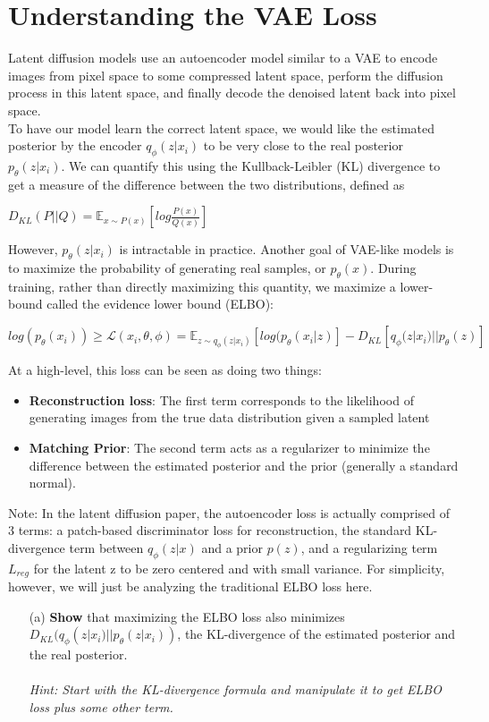 \documentclass[a4paper]{article}
\begin{document}
\section{Understanding the VAE Loss}

Latent diffusion models use an autoencoder model similar to a VAE to encode images from pixel space to some compressed latent space, perform the diffusion process in this latent space, and finally decode the denoised latent back into pixel space. \\

To have our model learn the correct latent space, we would like the estimated posterior by the encoder \(q_{\phi}(z|x_{i})\) to be very close to the real posterior \(p_{\theta}(z|x_i)\). We can quantify this using the Kullback-Leibler (KL) divergence to get a measure of the difference between the two distributions, defined as 
\begin{center}
\(D_{KL}(P||Q) = \mathbb{E}_{x\sim P(x)}[log \frac{P(x)}{Q(x)}]\)
\end{center}

However, \(p_{\theta}(z|x_i)\) is intractable in practice. Another goal of VAE-like models is to maximize the probability of generating real samples, or \(p_{\theta}(x)\). During training, rather than directly maximizing this quantity, we maximize a lower-bound called the evidence lower bound (ELBO):
\begin{center}
\(log(p_{\theta}(x_i)) \ge \mathcal{L}(x_{i}, \theta, \phi) = \mathbb{E}_{z\sim q_{\phi}(z|x_{i})}[log(p_{\theta}(x_i | z)] - D_{KL}[q_{\phi}(z|x_{i}) || p_{\theta}(z)]\)
\end{center}
At a high-level, this loss can be seen as doing two things:
\begin{itemize}
    \item \textbf {Reconstruction loss}: The first term corresponds to the likelihood of generating images from the true data distribution given a sampled latent
    \item \textbf {Matching Prior}: The second term acts as a regularizer to minimize the difference between the estimated posterior and the prior (generally a standard normal).
\end{itemize}
Note: In the latent diffusion paper, the autoencoder loss is actually comprised of 3 terms: a patch-based discriminator loss for reconstruction, the standard KL-divergence term between \(q_{\phi}(z|x)\) and a prior \(p(z)\), and a regularizing term \(L_{reg}\) for the latent z to be zero centered and with small variance. For simplicity, however, we will just be analyzing the traditional ELBO loss here.
\begin{itemize}
    \item [(a)] \textbf {Show} that maximizing the ELBO loss also minimizes \(D_{KL}(q_{\phi}(z|x_{i})||p_{\theta}(z|x_i))\), the KL-divergence of the estimated posterior and the real posterior. \\\\
    \emph {Hint: Start with the KL-divergence formula and manipulate it to get ELBO loss plus some other term.}
    
\end{itemize}
\end{document}
